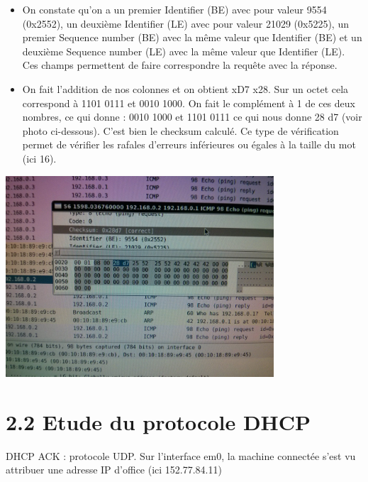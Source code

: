 \documentclass{article}
\begin{document}
\begin{itemize}\renewcommand{\labelitemi}{$\bullet$}
	\item On constate qu'on a un premier Identifier (BE) avec pour valeur 9554 (0x2552), un deuxième Identifier (LE) avec pour valeur 21029 (0x5225), un premier Sequence number (BE) avec la même valeur que Identifier (BE) et un deuxième Sequence number (LE) avec la même valeur que Identifier (LE). Ces champs permettent de faire correspondre la requête avec la réponse.
	\item On fait l'addition de nos colonnes et on obtient xD7 x28. Sur un octet cela correspond à 1101 0111 et 0010 1000. On fait le complément à 1 de ces deux nombres, ce qui donne : 0010 1000 et 1101 0111 ce qui nous donne 28 d7 (voir photo ci-dessous). C'est bien le checksum calculé. Ce type de vérification permet de vérifier les rafales d'erreurs inférieures ou égales à la taille du mot (ici 16).
\end{itemize}

\includegraphics[width=10cm]{screen5.jpg}
\section*{2.2 Etude du protocole DHCP}

DHCP ACK : protocole UDP.
Sur l'interface em0, la machine connectée s'est vu attribuer une adresse IP d'office (ici 152.77.84.11)
\end{document}
